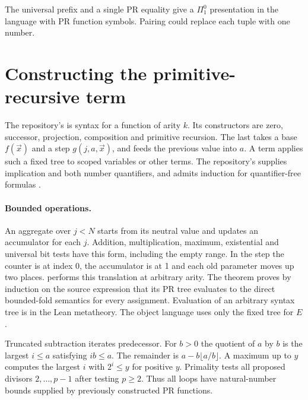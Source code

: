 \documentclass[11pt]{article}
\begin{document}
The universal prefix and a single PR equality give a \(\Pi^0_1\) presentation in the language with PR function symbols. Pairing could replace each tuple with one number.
\newpage
\section{Constructing the primitive-recursive term}\label{sec:kernel}
The repository's  is syntax for a function of arity \(k\). Its constructors are zero, successor, projection, composition and primitive recursion. The last takes a base \(f(\vec x)\) and a step \(g(j,a,\vec x)\), and feeds the previous value into \(a\). A term applies such a fixed tree to scoped variables or other terms. The repository's  supplies implication and both number quantifiers, and  admits induction for quantifier-free formulas \cite{repo}.

\paragraph{Bounded operations.}
An aggregate over \(j<N\) starts from its neutral value and updates an accumulator for each \(j\). Addition, multiplication, maximum, existential and universal bit tests have this form, including the empty range. In the step the counter is at index 0, the accumulator is at 1 and each old parameter moves up two places.  performs this translation at arbitrary arity. The theorem  proves by induction on the source expression that its PR tree evaluates to the direct bounded-fold semantics for every assignment. Evaluation of an arbitrary syntax tree is in the Lean metatheory. The object language uses only the fixed tree for \(E\).

Truncated subtraction iterates predecessor. For \(b>0\) the quotient of \(a\) by \(b\) is the largest \(i\le a\) satisfying \(ib\le a\). The remainder is \(a-b\lfloor a/b\rfloor\). A maximum up to \(y\) computes the largest \(i\) with \(2^i\le y\) for positive \(y\). Primality tests all proposed divisors \(2,\ldots,p-1\) after testing \(p\ge2\). Thus all loops have natural-number bounds supplied by previously constructed PR functions.
\end{document}
